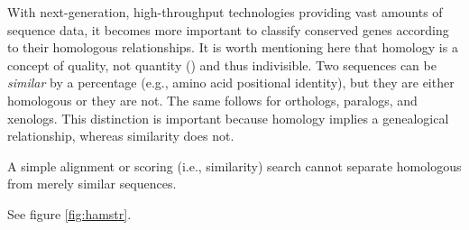 With next-generation, high-throughput technologies providing vast amounts of
sequence data, it becomes more important to classify conserved genes according
to their homologous relationships. It is worth mentioning here that homology is
a concept of quality, not quantity (\cite{reeck1987}) and thus indivisible. Two
sequences can be \emph{similar} by a percentage (e.g., amino acid positional
identity), but they are either homologous or they are not. The same follows for
orthologs, paralogs, and xenologs. This distinction is important because
homology implies a genealogical relationship, whereas similarity does not.

A simple alignment or scoring (i.e., similarity) search cannot separate
homologous from merely similar sequences. 

See figure \ref{fig:hamstr}.
